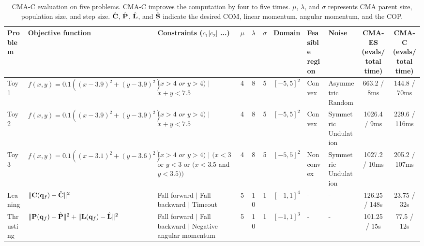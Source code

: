 \begin{center}
\begin{landscape}
\begin{table}[ht]
  \center
  \caption{      
    CMA-C evaluation on five problems. CMA-C improves the
    computation by four to five times. 
    $\mu$, $\lambda$, and $\sigma$ represents 
    CMA parent size, population size, and step size.
    $\hat{\mathbf{C}}$, $\hat{\mathbf{P}}$,
    $\hat{\mathbf{L}}$, and $\hat{\mathbf{S}}$ indicate the desired COM, linear
    momentum, angular momentum, and the COP.
  }
  \small
  \begin{tabular}{ | l | p{2.0cm} | p{3.0cm} | c | c | c | c | p{0.8cm} | p{1.15cm} | c | c |}
    \hline
    Problem & Objective function & Constraints ($c_1 | c_2 |$ ...) 
    & $\mu$ & $\lambda$ & $\sigma$ & Domain
    & \shortstack{ Feasible\\region} 
    & Noise
    & \shortstack{ CMA-ES\\ (evals/total time)} 
    & \shortstack{ CMA-C \\ (evals/total time)} \\ \hline

    Toy1 &$f(x,y)=0.1 ((x - 3.9)^2 + (y - 3.9)^2)$ & $(x > 4$ $or$ $y > 4)$ $|$ $x + y < 7.5$ 
    & 4 & 8 & 5 & $[-5, 5]^2$
    & Convex
    & Asymmetric Random
    & 663.2 / 8ms & 144.8 / 70ms \\ \hline

    Toy2 &$f(x,y)=0.1 ((x - 3.9)^2 + (y - 3.9)^2)$ & $(x > 4$ $or$ $y > 4)$ $|$ $x + y < 7.5$ 
    & 4 & 8 & 5 & $[-5, 5]^2$
    & Convex
    & Symmetric Undulation
    & 1026.4 / 9ms & 229.6 / 116ms \\ \hline


    Toy3 &$f(x,y)=0.1 ((x - 3.1)^2 + (y - 3.6)^2)$ &
    $(x > 4$ $or$ $y > 4)$ $|$ $(x < 3$ or 
    $y < 3$ or $(x < 3.5$ and $y < 3.5))$
    & 4 & 8 & 5 & $[-5, 5]^2$
    & Non convex
    & Symmetric Undulation
    & 1027.2 / 10ms & 205.2 / 107ms \\ \hline

    Leaning & $\| \mathbf{C}(\mathbf{q}_f) - \hat{\mathbf{C}} \|^2$ & 
    Fall forward $|$ Fall backward $|$ Timeout 
    & 5 & 10 & 1 & $[-1, 1]^4$
    & -
    & -
    & 126.25 / 148s & 23.75 / 32s\\ \hline

    Thrusting & $\| \mathbf{P}(\mathbf{q}_f) - \hat{\mathbf{P}} \|^2 + \|
    \mathbf{L}(\mathbf{q}_f) - \hat{\mathbf{L}} \|^2$ & 
    Fall forward $|$ Fall backward 
    $|$ Negative angular momentum
    & 5 & 10 & 1 & $[-1, 1]^3$
    & -
    & -
    & 101.25 / 15s & 77.5 / 12s \\ \hline


\end{tabular}
\end{table}
\end{landscape}
\end{center}
